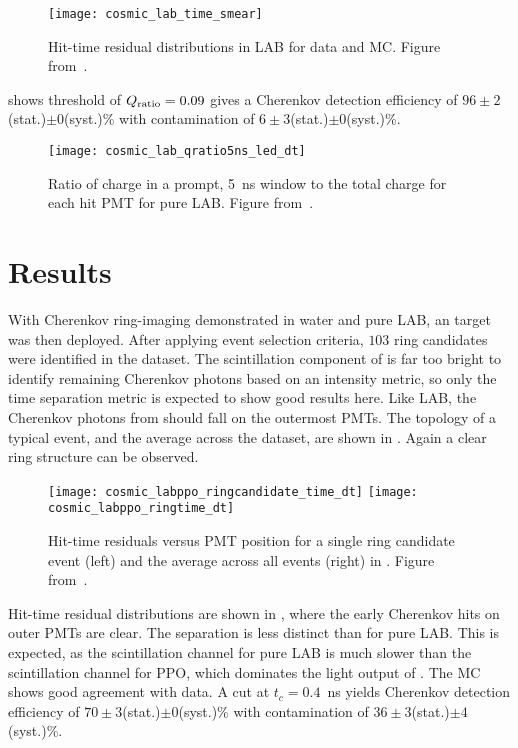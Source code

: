 \begin{figure}
\centering
\texttt{[image: cosmic\_lab\_time\_smear]}
\caption{Hit-time residual distributions in LAB for data and MC. Figure from~\cite{chess_lab}.}
\label{fig:lab}
\end{figure}

 shows threshold of $Q_{\rm ratio}=0.09$ gives a Cherenkov detection efficiency of $96\pm2$(stat.)$\pm0$(syst.)\% with contamination of $6\pm3$(stat.)$\pm0$(syst.)\%.

\begin{figure}
\centering
\texttt{[image: cosmic\_lab\_qratio5ns\_led\_dt]}
\caption{Ratio of charge in a prompt, 5~ns window to the total charge for each hit PMT  for pure LAB. Figure from~\cite{chess_lab}.}
\label{f:labQ}
\end{figure}

\clearpage

\section{\texorpdfstring{\labppo}{LAB+PPO} Results}
\label{sec:labppo}

With Cherenkov ring-imaging demonstrated in water and pure LAB, an {\labppo} target was then deployed.
After applying event selection criteria, $103$ ring candidates were identified in the {\labppo} dataset. 
The scintillation component of {\labppo} is far too bright to identify remaining Cherenkov photons based on an intensity metric, so only the time separation metric is expected to show good results here.
Like LAB, the Cherenkov photons from {\labppo} should fall on the outermost PMTs.
The topology of a typical event, and the average across the dataset, are shown in .  Again a clear ring structure can be observed. 
\begin{figure}
\centering
\texttt{[image: cosmic\_labppo\_ringcandidate\_time\_dt]}
\hfill
\texttt{[image: cosmic\_labppo\_ringtime\_dt]}	
\caption{Hit-time residuals versus PMT position for a single ring candidate event (left) and the average across all events (right) in {\labppo}. Figure from~\cite{chess_lab}.}
\label{fig:labppo_ring}
\end{figure}
Hit-time residual distributions are shown in , where the early Cherenkov hits on outer PMTs are clear. 
The separation is less distinct than for pure LAB.
This is expected, as the scintillation channel for pure LAB is much slower than the scintillation channel for PPO, which dominates the light output of {\labppo}.
The MC shows good agreement with data.  
A cut at $ t_c = 0.4$~ns yields Cherenkov detection efficiency of $70 \pm 3 $(stat.)$\pm0$(syst.)\% with contamination of $36 \pm 3 $(stat.)$\pm4$(syst.)\%. 

